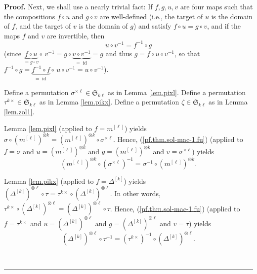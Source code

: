 \documentclass[numbers=enddot,12pt,final,onecolumn,notitlepage]{scrartcl}%
\theoremstyle{definition}
\newenvironment{proof}[1][Proof]{\noindent\textbf{#1.} }{\ \rule{0.5em}{0.5em}}
\begin{document}
\begin{proof}
Next, we shall use a nearly trivial fact: If $f,g,u,v$ are four maps such that
the compositions $f\circ u$ and $g\circ v$ are well-defined (i.e., the target
of $u$ is the domain of $f$, and the target of $v$ is the domain of $g$) and
satisfy $f\circ u=g\circ v$, and if the maps $f$ and $v$ are invertible, then%
\begin{equation}
u\circ v^{-1}=f^{-1}\circ g \label{pf.thm.sol-mac-1.fu}%
\end{equation}
(since $\underbrace{f\circ u}_{=g\circ v}\circ\,v^{-1}=g\circ
\underbrace{v\circ v^{-1}}_{=\operatorname*{id}}=g$ and thus $g=f\circ u\circ
v^{-1}$, so that $f^{-1}\circ g=\underbrace{f^{-1}\circ f}%
_{=\operatorname*{id}}\circ\,u\circ v^{-1}=u\circ v^{-1}$).

Define a permutation $\sigma^{\times\ell}\in\mathfrak{S}_{k\ell}$ as in Lemma
\ref{lem.pixl}. Define a permutation $\tau^{k\times}\in\mathfrak{S}_{k\ell}$
as in Lemma \ref{lem.pikx}. Define a permutation $\zeta\in\mathfrak{S}_{k\ell
}$ as in Lemma \ref{lem.zol1}.

Lemma \ref{lem.pixl} (applied to $f=m^{\left[  \ell\right]  }$) yields
$\sigma\circ\left(  m^{\left[  \ell\right]  }\right)  ^{\otimes k}=\left(
m^{\left[  \ell\right]  }\right)  ^{\otimes k}\circ\sigma^{\times\ell}$.
Hence, (\ref{pf.thm.sol-mac-1.fu}) (applied to $f=\sigma$ and $u=\left(
m^{\left[  \ell\right]  }\right)  ^{\otimes k}$ and $g=\left(  m^{\left[
\ell\right]  }\right)  ^{\otimes k}$ and $v=\sigma^{\times\ell}$) yields%
\begin{equation}
\left(  m^{\left[  \ell\right]  }\right)  ^{\otimes k}\circ\left(
\sigma^{\times\ell}\right)  ^{-1}=\sigma^{-1}\circ\left(  m^{\left[
\ell\right]  }\right)  ^{\otimes k}. \label{pf.thm.sol-mac-1.msig}%
\end{equation}


Lemma \ref{lem.pikx} (applied to $f=\Delta^{\left[  k\right]  }$) yields
$\left(  \Delta^{\left[  k\right]  }\right)  ^{\otimes\ell}\circ\tau
=\tau^{k\times}\circ\left(  \Delta^{\left[  k\right]  }\right)  ^{\otimes\ell
}$. In other words, $\tau^{k\times}\circ\left(  \Delta^{\left[  k\right]
}\right)  ^{\otimes\ell}=\left(  \Delta^{\left[  k\right]  }\right)
^{\otimes\ell}\circ\tau$. Hence, (\ref{pf.thm.sol-mac-1.fu}) (applied to
$f=\tau^{k\times}$ and $u=\left(  \Delta^{\left[  k\right]  }\right)
^{\otimes\ell}$ and $g=\left(  \Delta^{\left[  k\right]  }\right)
^{\otimes\ell}$ and $v=\tau$) yields%
\begin{equation}
\left(  \Delta^{\left[  k\right]  }\right)  ^{\otimes\ell}\circ\tau
^{-1}=\left(  \tau^{k\times}\right)  ^{-1}\circ\left(  \Delta^{\left[
k\right]  }\right)  ^{\otimes\ell}. \label{pf.thm.sol-mac-1.tauDel}%
\end{equation}



\end{proof}
\end{document}
